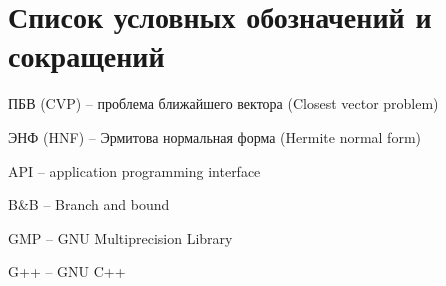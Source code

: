\newpage

\section{Список условных обозначений и сокращений}

ПБВ (CVP) -- проблема ближайшего вектора (Closest vector problem)

ЭНФ (HNF) -- Эрмитова нормальная форма (Hermite normal form)

API -- application programming interface

B\&B -- Branch and bound

GMP -- GNU Multiprecision Library

G++ -- GNU C++


\clearpage